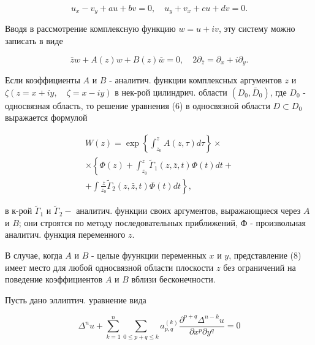 \documentclass[10pt]{article}
\begin{document}
\[

u_{x}-v_{y}+a u+b v=0, \quad u_{y}+v_{x}+c u+d v=0 .

\]



Вводя в рассмотрение комплексную функцию $w=u+i v$, эту систему можно записать в виде



\[

\bar{z} w+A(z) w+B(z) \bar{w}=0, \quad 2 \partial_{\bar{z}}=\partial_{x}+i \partial_{y} .

\]



Если коэффициенты $A$ и $B$ - аналитич. функции комплексных аргументов $z$ и $\zeta(z=x+i y, \quad \zeta=x-i y)$ в нек-рой цилиндрич. области $\left(D_{0}, \bar{D}_{0}\right)$, где $D_{0}$ - односвязная область, то решение уравнения (6) в односвязной области $D \subset D_{0}$ выражается формулой



\[

\begin{gathered}

W(z)=\exp \left\{\int_{z_{0}}^{z} A(z, \tau) d \tau\right\} \times \\

\times\left\{\Phi(z)+\int_{z_{0}}^{z} \tilde{\Gamma}_{1}(z, \bar{z}, t) \Phi(t) d t+\right. \\

\left.+\int \frac{\bar{z}}{z_{0}} \tilde{\Gamma}_{2}(z, \bar{z}, t) \Phi(t) d t\right\},

\end{gathered}

\]



в к-рой $\tilde{\Gamma}_{1}$ и $\tilde{\Gamma}_{2}-$ аналитич. функции своих аргументов, выражающиеся через $A$ и $B$; они строятся по методу последовательных приближений, Ф - произвольная аналитич. функция переменного $z$.



В случае, когда $A$ и $B$ - целые фуункции переменных $x$ и $y$, представление (8) имеет место для любой односвязной области плоскости $z$ без ограничений на поведение коэффициентов $A$ и $B$ вблизи бесконечности.



Пусть дано эллиптич. уравнение вида



\[

\Delta^{n} u+\sum_{k=1}^{n} \sum_{0 \leqslant p+q \leqslant k} a_{p, q}^{(k)} \frac{\partial^{p+q} \Delta^{n-k} u}{\partial x^{p} \partial y^{q}}=0

\]
\end{document}
